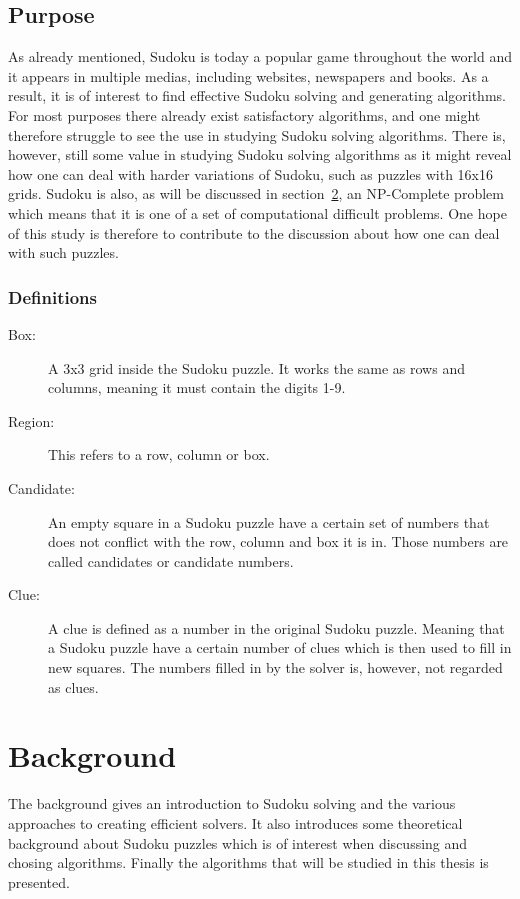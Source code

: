 \documentclass[a4paper,11pt]{kth-mag}
\begin{document}
\FloatBarrier
\section{Purpose}
As already mentioned, Sudoku is today a popular game throughout the world and it appears in multiple medias, including websites, newspapers and books. 
As a result, it is of interest to find effective Sudoku solving and generating algorithms. 
For most purposes there already exist satisfactory algorithms, and one might therefore struggle to see the use in studying Sudoku solving algorithms. 
There is, however, still some value in studying Sudoku solving algorithms as it might reveal how one can deal with harder variations of Sudoku, such as puzzles with 16x16 grids. 
Sudoku is also, as will be discussed in section~\ref{sec:background}, an NP-Complete problem which means that it is one of a set of computational difficult problems.\cite{complexity} 
One hope of this study is therefore to contribute to the discussion about how one can deal with such puzzles. 

\subsection{Definitions}
\begin{description}
    \item[Box:] A 3x3 grid inside the Sudoku puzzle. It works the same as rows and columns, meaning it must contain the digits 1-9.
    \item[Region:] This refers to a row, column or box.
    \item[Candidate:] An empty square in a Sudoku puzzle have a certain set of numbers that does not conflict with the row, column and box it is in. Those numbers are called candidates or candidate numbers.
    \item[Clue:] A clue is defined as a number in the original Sudoku puzzle. Meaning that a Sudoku puzzle have a certain number of clues which is then used to fill in new squares. The numbers filled in by the solver is, however, not regarded as clues.
\end{description}

\chapter{Background}
\label{sec:background}
The background gives an introduction to Sudoku solving and the various approaches to creating efficient solvers. It also introduces some theoretical background about Sudoku puzzles which is of interest when discussing and chosing algorithms. Finally the algorithms that will be studied in this thesis is presented.
\end{document}
